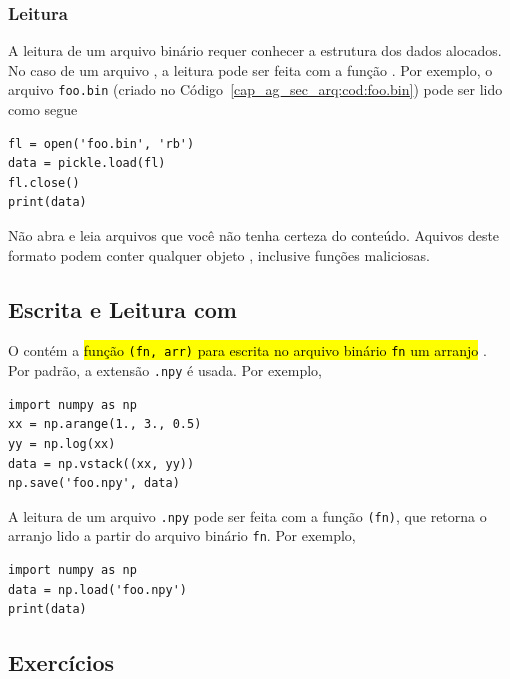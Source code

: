 \subsubsection{Leitura}

A leitura de um arquivo binário requer conhecer a estrutura dos dados alocados. No caso de um arquivo {\PYTHONpickle}, a leitura pode ser feita com a função {\PYTHONpickleDOTload}. Por exemplo, o arquivo \texttt{foo.bin} (criado no Código~\ref{cap_ag_sec_arq:cod:foo.bin}) pode ser lido como segue

\begin{lstlisting}
fl = open('foo.bin', 'rb')
data = pickle.load(fl)
fl.close()
print(data)
\end{lstlisting}

\begin{obs}
  Não abra e leia arquivos {\PYTHONpickle} que você não tenha certeza do conteúdo. Aquivos deste formato podem conter qualquer objeto {\python}, inclusive funções maliciosas.
\end{obs}

\subsection{Escrita e Leitura com {\numpy}}

O {\numpy} contém a \hl{função {\PYTHONnumpyDOTsave}\texttt{(fn, arr)} para escrita no arquivo binário \texttt{fn} um arranjo {\PYTHONnumpyDOTarray}}. Por padrão, a extensão \texttt{.npy} é usada. Por exemplo,

\begin{lstlisting}
import numpy as np
xx = np.arange(1., 3., 0.5)
yy = np.log(xx)
data = np.vstack((xx, yy))
np.save('foo.npy', data)
\end{lstlisting}

A leitura de um arquivo \texttt{.npy} pode ser feita com a função {\PYTHONnumpyDOTload}\texttt{(fn)}, que retorna o arranjo lido a partir do arquivo binário \texttt{fn}. Por exemplo,

\begin{lstlisting}
import numpy as np
data = np.load('foo.npy')
print(data)
\end{lstlisting}

\subsection{Exercícios}

